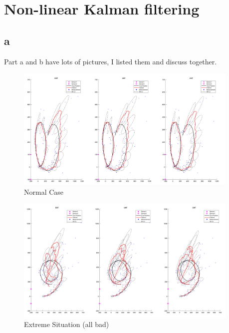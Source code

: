 \section{Non-linear Kalman filtering}

\subsection{a}

Part a and b have lots of pictures, I listed them and discuss together.

\begin{figure}[H]
 \centering
 \includegraphics[width=0.95\textwidth]{images/normala.png}
 \caption{Normal Case}
 \label{normal}
\end{figure}


\begin{figure}[H]
 \centering
 \includegraphics[width=0.95\textwidth]{images/case1.png}
 \caption{Extreme Situation (all bad)}
 \label{allbad}
\end{figure}

